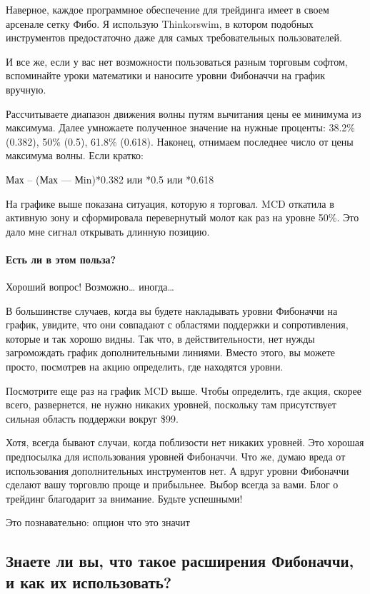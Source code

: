 \documentclass{book}
\begin{document}
Наверное, каждое программное обеспечение для трейдинга имеет в своем арсенале сетку Фибо. Я использую Thinkorswim, в котором подобных инструментов предостаточно даже для самых требовательных пользователей.

И все же, если у вас нет возможности пользоваться разным торговым софтом, вспоминайте уроки математики и наносите уровни Фибоначчи на график вручную.

Рассчитываете диапазон движения волны путям вычитания цены ее минимума из максимума. Далее умножаете полученное значение на нужные проценты: 38.2\% (0.382), 50\% (0.5), 61.8\% (0.618). Наконец, отнимаем последнее число от цены максимума волны. Если кратко:

Мах – (Мах — Мin)*0.382 или *0.5 или *0.618

На графике выше показана ситуация, которую я торговал. MCD откатила в активную зону и сформировала перевернутый молот как раз на уровне 50\%. Это дало мне сигнал открывать длинную позицию.

\paragraph{Есть ли в этом польза?}

Хороший вопрос! Возможно… иногда…

В большинстве случаев, когда вы будете накладывать уровни Фибоначчи на график, увидите, что они совпадают с областями поддержки и сопротивления, которые и так хорошо видны. Так что, в действительности, нет нужды загромождать график дополнительными линиями. Вместо этого, вы можете просто, посмотрев на акцию определить, где находятся уровни.

Посмотрите еще раз на график MCD выше. Чтобы определить, где акция, скорее всего, развернется, не нужно никаких уровней, поскольку там присутствует сильная область поддержки вокруг \$99.

Хотя, всегда бывают случаи, когда поблизости нет никаких уровней. Это хорошая предпосылка для использования уровней Фибоначчи. Что же, думаю вреда от использования дополнительных инструментов нет. А вдруг уровни Фибоначчи сделают вашу торговлю проще и прибыльнее. Выбор всегда за вами. Блог о трейдинг благодарит за внимание. Будьте успешными!


Это познавательно: опцион что это значит

\subsection{Знаете ли вы, что такое расширения Фибоначчи, и как их
  использовать?}
\end{document}
